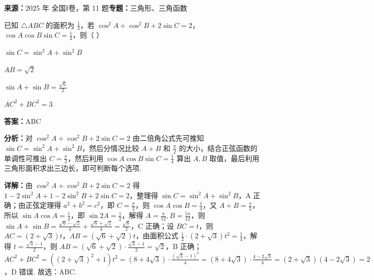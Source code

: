 \begin{question}[points=6]
\textbf{来源：}2025 年 全国I卷，第 11 题\quad \textbf{专题：}三角形、三角函数\par
已知 $\triangle ABC$ 的面积为 $\frac{1}{4}$，若 $\cos^2 A + \cos^2 B + 2\sin C = 2$，$\cos A \cos B \sin C = \frac{1}{4}$，则（ ）
\begin{choices}
  \item $\sin C = \sin^2 A + \sin^2 B$
  \item $AB = \sqrt{2}$
  \item $\sin A + \sin B = \frac{\sqrt{6}}{2}$
  \item $AC^2 + BC^2 = 3$
\end{choices}
\begin{solution}
\textbf{答案：}ABC

\textbf{分析：}对 $\cos^2 A + \cos^2 B + 2\sin C = 2$ 由二倍角公式先可推知 $\sin C = \sin^2 A + \sin^2 B$，然后分情况比较 $A+B$ 和 $\frac{\pi}{2}$ 的大小，结合正弦函数的单调性可推出 $C = \frac{\pi}{2}$，然后利用 $\cos A \cos B \sin C = \frac{1}{4}$ 算出 $A,B$ 取值，最后利用三角形面积求出三边长，即可判断每个选项.

\textbf{详解：}由 $\cos^2 A + \cos^2 B + 2\sin C = 2$ 得 $1-2\sin^2 A + 1-2\sin^2 B + 2\sin C = 2$，整理得 $\sin C = \sin^2 A + \sin^2 B$，A 正确；由正弦定理得 $a^2+b^2=c^2$，即 $C = \frac{\pi}{2}$，则 $\cos A \cos B = \frac{1}{4}$，又 $A+B=\frac{\pi}{2}$，所以 $\sin A \cos A = \frac{1}{4}$，即 $\sin 2A = \frac{1}{2}$，解得 $A = \frac{\pi}{12}, B = \frac{5\pi}{12}$，则 $\sin A + \sin B = \frac{\sqrt{6}-\sqrt{2}}{4} + \frac{\sqrt{6}+\sqrt{2}}{4} = \frac{\sqrt{6}}{2}$，C 正确；设 $BC = t$，则 $AC = (2+\sqrt{3})t$，$AB = (\sqrt{6}+\sqrt{2})t$，由面积公式 $\frac{1}{2} \cdot (2+\sqrt{3})t^2 = \frac{1}{4}$，解得 $t = \frac{\sqrt{3}-1}{2}$，则 $AB = (\sqrt{6}+\sqrt{2}) \cdot \frac{\sqrt{3}-1}{2} = \sqrt{2}$，B 正确；$AC^2+BC^2 = ((2+\sqrt{3})^2+1)t^2 = (8+4\sqrt{3}) \cdot \frac{(\sqrt{3}-1)^2}{4} = (8+4\sqrt{3}) \cdot \frac{4-2\sqrt{3}}{4} = (2+\sqrt{3})(4-2\sqrt{3}) = 2$，D 错误. 故选：ABC.
\end{solution}
\end{question}

